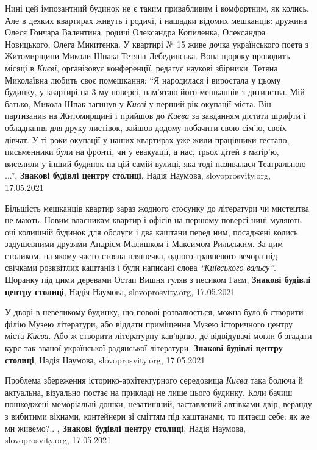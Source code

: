 Нині цей імпозантний будинок не є таким привабливим і комфортним, як колись.
Але в деяких квартирах живуть і родичі, і нащадки відомих мешканців: дружина
Олеся Гончара Валентина, родичі Олександра Копиленка, Олександра Новицького,
Олега Микитенка. У квартирі № 15 живе дочка українського поета з Житомирщини
Миколи Шпака Тетяна Лебединська. Вона щороку проводить місяці в \emph{Києві},
організовує конференції, редагує наукові збірники. Тетяна Миколаївна любить
своє помешкання: \enquote{Я народилася і виростала у цьому будинку, у квартирі на 3-му
поверсі, пам’ятаю його мешканців з дитинства. Мій батько, Микола Шпак загинув у
\emph{Києві} у перший рік окупації міста. Він партизанив на Житомирщині і прийшов до
\emph{Києва} за завданням дістати шрифти і обладнання для друку листівок, зайшов
додому побачити свою сім’ю, своїх дівчат. У ті роки окупації у наших квартирах
уже жили працівники гестапо, письменники були на фронті, чи у евакуації, а нас,
трьох дітей з матір’ю, виселили у інший будинок на цій самій вулиці, яка тоді
називалася Театральною ...},
\textbf{Знакові будівлі центру столиці}, Надія Наумова, slovoprosvity.org, 17.05.2021

Більшість мешканців квартир зараз жодного стосунку до літератури чи мистецтва
не мають. Новим власникам квартир і офісів на першому поверсі нині муляють очі
колишній будинок для обслуги і два каштани перед ним, посаджені колись
задушевними друзями Андрієм Малишком і Максимом Рильським. За цим столиком, на
якому часто стояла пляшечка, одного травневого вечора під свічками розквітлих
каштанів і були написані слова \emph{\enquote{Київського вальсу}}. Щоранку під цими деревами
Остап Вишня гуляв з песиком Гаєм,
\textbf{Знакові будівлі центру столиці}, Надія Наумова, slovoprosvity.org, 17.05.2021

У дворі в невеликому будинку, що поволі розвалюється, можна було б створити
філію Музею літератури, або віддати приміщення Музею історичного центру міста
\emph{Києва}. Або ж створити літературну кав’ярню, де відвідувачі могли б
згадати курс так званої української радянської літератури,
\textbf{Знакові будівлі центру столиці}, Надія Наумова, slovoprosvity.org, 17.05.2021

Проблема збереження історико-архітектурного середовища \emph{Києва} така болюча
й актуальна, візуально постає на прикладі не лише цього будинку. Коли бачиш
пошкоджені меморіальні дошки, незатишний, заставлений автівками двір, веранду з
вибитими вікнами, контейнери зі сміттям під каштанами, то питаєш себе: як же ми
живемо?.. ,
\textbf{Знакові будівлі центру столиці}, Надія Наумова, slovoprosvity.org, 17.05.2021

